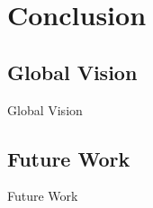 \newpage
\section{Conclusion}

\subsection{Global Vision}

Global Vision

\subsection{Future Work}

Future Work